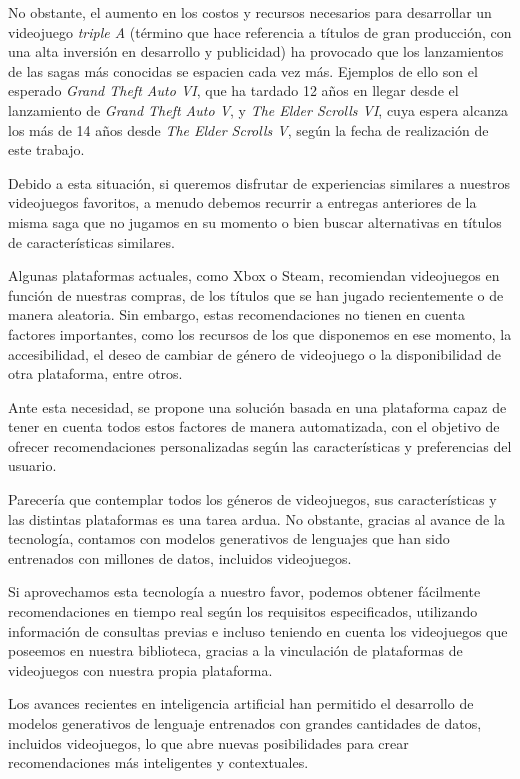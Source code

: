 No obstante, el aumento en los costos y recursos necesarios para desarrollar un videojuego \textit{triple A} (término que hace referencia a títulos de gran producción, con una alta inversión en desarrollo y publicidad) ha provocado que los lanzamientos de las sagas más conocidas se espacien cada vez más. Ejemplos de ello son el esperado \textit{Grand Theft Auto VI}, que ha tardado 12 años en llegar desde el lanzamiento de \textit{Grand Theft Auto V}, y \textit{The Elder Scrolls VI}, cuya espera alcanza los más de 14 años desde \textit{The Elder Scrolls V}, según la fecha de realización de este trabajo.  


Debido a esta situación, si queremos disfrutar de experiencias similares a nuestros videojuegos favoritos, a menudo debemos recurrir a entregas anteriores de la misma saga que no jugamos en su momento o bien buscar alternativas en títulos de características similares.  


Algunas plataformas actuales, como Xbox o Steam, recomiendan videojuegos en función de nuestras compras, de los títulos que se han jugado recientemente o de manera aleatoria. Sin embargo, estas recomendaciones no tienen en cuenta factores importantes, como los recursos de los que disponemos en ese momento, la accesibilidad, el deseo de cambiar de género de videojuego o la disponibilidad de otra plataforma, entre otros.  


Ante esta necesidad, se propone una solución basada en una plataforma capaz de tener en cuenta todos estos factores de manera automatizada, con el objetivo de ofrecer recomendaciones personalizadas según las características y preferencias del usuario.



Parecería que contemplar todos los géneros de videojuegos, sus características y las distintas plataformas es una tarea ardua. No obstante, gracias al avance de la tecnología, contamos con modelos generativos de lenguajes que han sido entrenados con millones de datos, incluidos videojuegos.  

Si aprovechamos esta tecnología a nuestro favor, podemos obtener fácilmente recomendaciones en tiempo real según los requisitos especificados, utilizando información de consultas previas e incluso teniendo en cuenta los videojuegos que poseemos en nuestra biblioteca, gracias a la vinculación de plataformas de videojuegos con nuestra propia plataforma.  


Los avances recientes en inteligencia artificial han permitido el desarrollo de modelos generativos de lenguaje entrenados con grandes cantidades de datos, incluidos videojuegos, lo que abre nuevas posibilidades para crear recomendaciones más inteligentes y contextuales.


